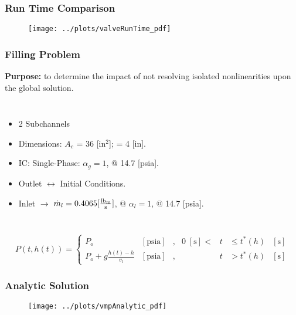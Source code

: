 \documentclass[compress,xcolor=table]{beamer}
\begin{document}
\begin{frame}
\frametitle{Run Time Comparison}

\begin{figure}[h!t]
\centering
\texttt{[image: ../plots/valveRunTime\_pdf]}
\end{figure}



\end{frame}
\begin{frame}
\frametitle{Filling Problem}

\textbf{Purpose:} to determine the impact of not resolving isolated nonlinearities upon the global solution.
\begin{columns}
\begin{itemize}
\item{2 Subchannels}
\item{Dimensions: $A_{c}$ = 36 [in$^2$]; \dx{} = 4 [in].}
\item{IC: Single-Phase: $\alpha_{g} = 1$, @ 14.7 [psia].}
\item{Outlet $\longleftrightarrow$ Initial Conditions.}
\item{Inlet $\rightarrow$ $\dot{m}_{l} = 0.4065 [\frac{\lbm{}}{\text{s}}]$, @ $\alpha_{l}=1$, @ 14.7 [psia].}
\end{itemize}
\resizebox{!}{0.50\textheight}{

}
\end{columns}

\begin{equation*}
P(t, h(t))= 
 \left\{
\begin{array}{cclrcll}
P_o & [ \text{psia} ] & , & 0\; [\text{s}] < & t & \leq t^{*}(h) & [\text{s}] \\
P_o + g \frac{ h(t) - h }{ v_{l} } & [ \text{psia} ] & , &  & t & > t^{*}(h) & [\text{s}]
\end{array}\right.
\end{equation*}

\end{frame}
\begin{frame}
\frametitle{Analytic Solution}

\begin{figure}[h!t]
\centering
\texttt{[image: ../plots/vmpAnalytic\_pdf]}
\end{figure}

\end{frame}
\end{document}
